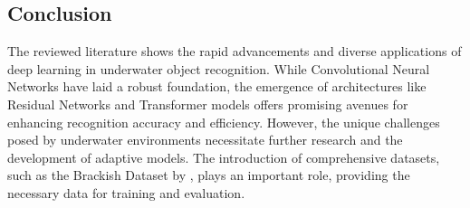 \subsection{Conclusion}
The reviewed literature shows the rapid advancements and diverse applications
of deep learning in underwater object recognition.
While Convolutional Neural Networks have laid a robust foundation,
the emergence of architectures like Residual Networks and Transformer models offers
promising avenues for enhancing recognition accuracy and efficiency.
However, the unique challenges posed by underwater environments necessitate further
research and the development of adaptive models.
The introduction of comprehensive datasets,
such as the Brackish Dataset by \Textcite{pedersenDetectionMarineAnimals2019}, plays
an important role, providing the necessary data for training and evaluation.